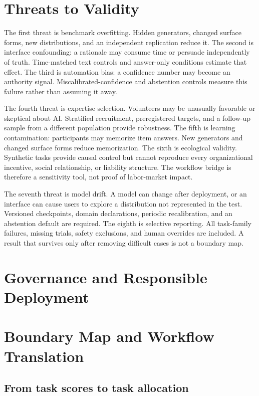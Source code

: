 \documentclass[conference]{IEEEtran}
\begin{document}
\section{Threats to Validity}

The first threat is benchmark overfitting. Hidden generators, changed surface forms, new distributions, and an independent replication reduce it. The second is interface confounding: a rationale may consume time or persuade independently of truth. Time-matched text controls and answer-only conditions estimate that effect. The third is automation bias: a confidence number may become an authority signal. Miscalibrated-confidence and abstention controls measure this failure rather than assuming it away.

The fourth threat is expertise selection. Volunteers may be unusually favorable or skeptical about AI. Stratified recruitment, preregistered targets, and a follow-up sample from a different population provide robustness. The fifth is learning contamination: participants may memorize item answers. New generators and changed surface forms reduce memorization. The sixth is ecological validity. Synthetic tasks provide causal control but cannot reproduce every organizational incentive, social relationship, or liability structure. The workflow bridge is therefore a sensitivity tool, not proof of labor-market impact.

The seventh threat is model drift. A model can change after deployment, or an interface can cause users to explore a distribution not represented in the test. Versioned checkpoints, domain declarations, periodic recalibration, and an abstention default are required. The eighth is selective reporting. All task-family failures, missing trials, safety exclusions, and human overrides are included. A result that survives only after removing difficult cases is not a boundary map.

\section{Governance and Responsible Deployment}

\section{Boundary Map and Workflow Translation}

\subsection{From task scores to task allocation}
\end{document}
